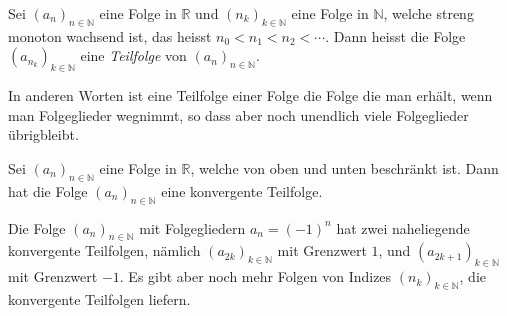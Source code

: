 \documentclass[../main.tex]{subfiles}
\begin{document}
\begin{definition}
  Sei ${(a_n)}_{n \in \mathbb{N}}$ eine Folge in $\mathbb{R}$ 
  und ${(n_k)}_{k \in \mathbb{N}}$ eine Folge in $\mathbb{N}$,
  welche streng monoton wachsend ist, das heisst
  \(
    n_0 < n_1 < n_2 < \cdots.
  \)
  Dann heisst die Folge ${(a_{n_k})}_{k \in \mathbb{N}}$ 
eine \emph{Teilfolge} von ${(a_n)}_{n \in \mathbb{N}}$.
\end{definition}

In anderen Worten ist eine Teilfolge einer Folge
die Folge die man erhält, wenn man Folgeglieder
wegnimmt, so dass aber noch unendlich viele
Folgeglieder übrigbleibt.

\begin{theorem}\label{thm:bolzano-weierstrass}
  Sei ${(a_n)}_{n \in \mathbb{N}}$ eine Folge in $\mathbb{R}$,
  welche von oben und unten beschränkt ist.
  Dann hat die Folge ${(a_n)}_{n \in \mathbb{N}}$
  eine konvergente Teilfolge.
\end{theorem}

\begin{example}
  Die Folge ${(a_n)}_{n \in \mathbb{N}}$ mit Folgegliedern
  $a_n = {(-1)}^n$ hat zwei naheliegende konvergente Teilfolgen,
  nämlich ${(a_{2k})}_{k \in \mathbb{N}}$ mit Grenzwert $1$,
  und ${(a_{2k+1})}_{k \in \mathbb{N}}$ mit Grenzwert $-1$.
  Es gibt aber noch mehr Folgen von Indizes 
  ${(n_k)}_{k \in \mathbb{N}}$, die
  konvergente Teilfolgen liefern.
\end{example}
\end{document}
